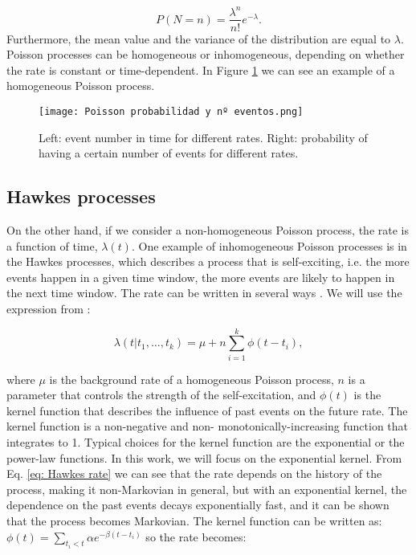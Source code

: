 \begin{equation}
    P(N=n) = \dfrac{\lambda^n}{n!}e^{-\lambda}.
    \label{eq: Probabilidad proceso de Poisson homogéneo}
\end{equation}
Furthermore, the mean value and the variance of the distribution are equal to $\lambda$. Poisson processes can be homogeneous or inhomogeneous, depending on whether the rate is constant
or time-dependent. In Figure \ref{f:poisson} we can see an example of a homogeneous Poisson process.

\begin{figure}[H]
    \centering
    \texttt{[image: Poisson probabilidad y nº eventos.png]}
    \caption{Left: event number in time for different rates. Right: probability of having a certain number of events for different rates.}
    \label{f:poisson}
\end{figure}

\subsection{Hawkes processes} \label{subsec:Hawkes_processes}

On the other hand, if we consider a non-homogeneous Poisson process, the rate is a function of time, $\lambda(t)$. One example of inhomogeneous Poisson processes is in the Hawkes processes, which 
describes a process that is self-exciting, i.e. the more events happen in a given time window, the more events are likely to happen in the next time window.
 The rate can be written in several 
ways \cite{notarmuzi2021percolation,kanazawa2021ubiquitous,dassios2013exact,laub2021elements}. We will use the expression from \cite{notarmuzi2021percolation}:

\begin{equation}
    \lambda(t|t_1, \ldots, t_k) = \mu + n\sum_{i=1}^k \phi (t-t_i),
    \label{eq: Hawkes rate}
\end{equation}

where $\mu$ is the background rate of a homogeneous Poisson process, $n$ is a parameter that controls the strength of the self-excitation, and $\phi(t)$ is the kernel function that
describes the influence of past events on the future rate. The kernel function is a non-negative and non- monotonically-increasing function that integrates to 1.
Typical choices for the kernel function are the exponential or the power-law functions. In this work, we will focus on the exponential kernel. 
From Eq. \ref{eq: Hawkes rate} we can see that the rate depends on the history of the process, making it non-Markovian in general, but with an exponential kernel, the dependence on the 
past events decays exponentially fast, and it can be shown that the process becomes Markovian. The kernel function can be written as: $\phi(t)=\sum_{t_i<t}\alpha e^{-\beta(t-t_i)}$ 
so the rate becomes:

